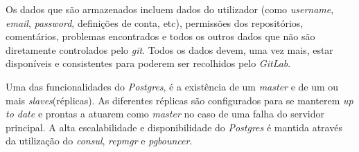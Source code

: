 \documentclass[12pt,a4paper]{article}
\begin{document}
Os dados que são armazenados incluem dados do utilizador (como \emph{username}, \emph{email}, \emph{password}, definições de conta, etc), permissões dos repositórios, comentários, problemas encontrados e todos os outros dados que não são diretamente controlados pelo \emph{git}. Todos os dados devem, uma vez mais, estar disponíveis e consistentes para poderem ser recolhidos pelo \emph{GitLab}.


Uma das funcionalidades do \emph{Postgres}, é a existência de um \emph{master} e de um ou mais \emph{slaves}(réplicas). As diferentes réplicas são configurados para se manterem \emph{up to date} e prontas a atuarem como \emph{master} no caso de uma falha do servidor principal. A alta escalabilidade e disponibilidade do \emph{Postgres} é mantida através da utilização do \emph{consul}, \emph{repmgr} e \emph{pgbouncer}.



\end{document}
